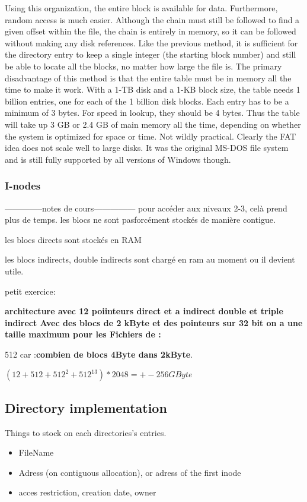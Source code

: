 Using this organization, the entire block is available for data. Furthermore, random
access is much easier. Although the chain must still be followed to find a
given offset within the file, the chain is entirely in memory, so it can be followed
without making any disk references. Like the previous method, it is sufficient for
the directory entry to keep a single integer (the starting block number) and still be
able to locate all the blocks, no matter how large the file is.
The primary disadvantage of this method is that the entire table must be in
memory all the time to make it work. With a 1-TB disk and a 1-KB block size, the
table needs 1 billion entries, one for each of the 1 billion disk blocks. Each entry
has to be a minimum of 3 bytes. For speed in lookup, they should be 4 bytes. Thus
the table will take up 3 GB or 2.4 GB of main memory all the time, depending on
whether the system is optimized for space or time. Not wildly practical. Clearly the
FAT idea does not scale well to large disks. It was the original MS-DOS file system
and is still fully supported by all versions of Windows though.
 
\newpage
\subsubsection{I-nodes}
--------------notes de cours---------------
pour accéder aux niveaux 2-3, celà prend plus de temps. les blocs ne sont pasforcément stockés
de manière contigue.

les blocs directs sont stockés en RAM

les blocs indirects, double indirects sont chargé en ram au moment ou il devient utile.

petit exercice:

\textbf{architecture avec 12 poiinteurs direct et a indirect double et triple indirect Avec des blocs de 2 kByte et des pointeurs sur 32 bit on a une taille maximum pour les Fichiers de :}

512 car :\textbf{combien de blocs 4Byte dans 2kByte}.


$(12+512+512^{2}+512^{13})*2048 = +-256GByte$



\newpage
\subsection{Directory implementation}
Things to stock on each directories's entries.
\begin{itemize}
    \item FileName
    \item Adress (on contiguous allocation), or adress of the first inode
    \item acces restriction, creation date, owner
\end{itemize}

